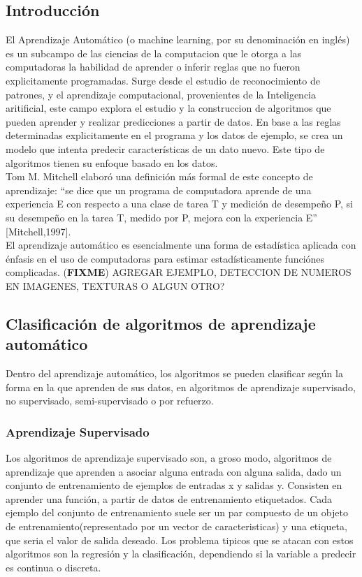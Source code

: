 \documentclass[a4paper,11pt,spanish]{book}
\newcommand*{\FIXME}[1]{{(\textbf{FIXME}) {#1}}}
\begin{document}
    \subsection{Introducción}
      El Aprendizaje Automático (o machine learning, por su denominación en inglés) es un subcampo de las ciencias de la computacion que le otorga a las computadoras la habilidad de aprender o inferir reglas que no fueron explicitamente programadas.
      Surge desde el estudio de reconocimiento de patrones, y el aprendizaje computacional, provenientes de la Inteligencia aritificial, este campo explora el estudio y la construccion de algoritmos
      que pueden aprender y realizar predicciones a partir de datos. En base a las reglas determinadas explicitamente en el programa y los datos de ejemplo, se crea un modelo que intenta predecir
      características de un dato nuevo. Este tipo de algoritmos tienen su enfoque basado en los datos.\\
      Tom M. Mitchell elaboró una definición más formal de este concepto de aprendizaje: “se dice que un programa de computadora aprende de una experiencia E con respecto a una clase 
      de tarea T y medición de desempeño P, si su desempeño en la tarea T, medido por P, mejora con la experiencia E” [Mitchell,1997].\\
      El aprendizaje automático es esencialmente una forma de estadística aplicada con énfasis en el uso de computadoras para estimar estadísticamente funciónes complicadas.
      \FIXME{AGREGAR EJEMPLO, DETECCION DE NUMEROS EN IMAGENES, TEXTURAS O ALGUN OTRO?}

    \subsection{Clasificación de algoritmos de aprendizaje automático}
      Dentro del aprendizaje automático, los algoritmos se pueden clasificar según la forma en la que aprenden de sus datos, en algoritmos de aprendizaje supervisado, no supervisado, 
      semi-supervisado o por refuerzo.

      \subsubsection{Aprendizaje Supervisado}
	Los algoritmos de aprendizaje supervisado son, a groso modo, algoritmos de aprendizaje que aprenden a asociar alguna entrada con alguna salida, 
	dado un conjunto de entrenamiento de ejemplos de entradas x y salidas y.
	Consisten en aprender una función, a partir de datos de entrenamiento etiquetados. Cada ejemplo del conjunto de entrenamiento suele ser un par
	compuesto de un objeto de entrenamiento(representado por un vector de caracteristicas) y una etiqueta, que seria el valor de salida deseado.
	Los problema tipicos que se atacan con estos algoritmos son la regresión y la clasificación, dependiendo si la variable a predecir es continua o discreta. \\
\end{document}
